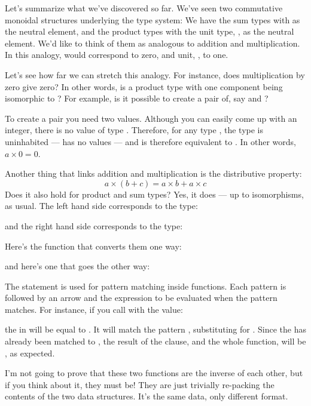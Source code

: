 Let's summarize what we've discovered so far. We've seen two commutative
monoidal structures underlying the type system: We have the sum types
with  as the neutral element, and the product types with
the unit type, \code{()}, as the neutral element. We'd like to think
of them as analogous to addition and multiplication. In this analogy,
 would correspond to zero, and unit, \code{()}, to one.

Let's see how far we can stretch this analogy. For instance, does
multiplication by zero give zero? In other words, is a product type with
one component being  isomorphic to ? For
example, is it possible to create a pair of, say  and
?

To create a pair you need two values. Although you can easily come up
with an integer, there is no value of type . Therefore, for
any type , the type  is uninhabited --- has
no values --- and is therefore equivalent to . In other
words, $a \times 0 = 0$.

Another thing that links addition and multiplication is the distributive
property:
\[a \times (b + c) = a \times b + a \times c\]
Does it also hold for product and sum types? Yes, it does --- up to
isomorphisms, as usual. The left hand side corresponds to the type:

and the right hand side corresponds to the type:

Here's the function that converts them one way:

and here's one that goes the other way:

The  statement is used for pattern matching inside
functions. Each pattern is followed by an arrow and the expression to be
evaluated when the pattern matches. For instance, if you call
 with the value:

the  in  will be equal to
. It will match the pattern ,
substituting  for . Since the  has
already been matched to , the result of the 
clause, and the whole function, will be , as
expected.

I'm not going to prove that these two functions are the inverse of each
other, but if you think about it, they must be! They are just trivially
re-packing the contents of the two data structures. It's the same data,
only different format.

